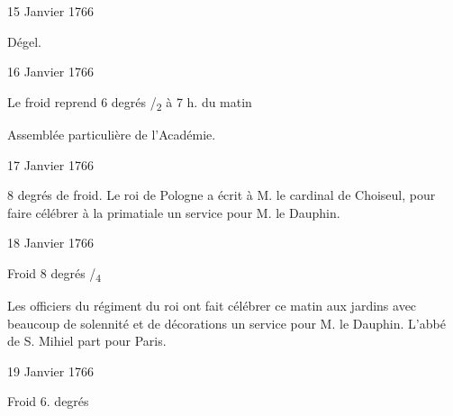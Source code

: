                      \begin{diary}{15 Janvier 1766}{}

                         Dégel. \bigskip


                     \end{diary}
                     \begin{diary}{16 Janvier 1766}{}

                         Le froid reprend 6 degrés
                              /\textsubscript{2} à 7 h. du matin
                        \bigskip


                         Assemblée particulière de l'Académie. \bigskip


                     \end{diary}

                     \begin{diary}{17 Janvier 1766}{}


                           8 degrés de froid. Le
                              roi de Pologne a écrit à
                           M. le cardinal de Choiseul, pour faire célébrer
                           à la primatiale un
                           service pour M. le Dauphin.
                        \bigskip


                     \end{diary}

                     \begin{diary}{18 Janvier 1766}{}


                           Froid 8 degrés
                              /\textsubscript{4}
                        \bigskip


                         Les officiers du régiment du roi ont fait célébrer
                           ce matin aux jardins avec beaucoup de
                           solennité et de décorations un service pour
                           M. le Dauphin. L'abbé de S. Mihiel part pour
                              Paris. \bigskip


                     \end{diary}

                     \begin{diary}{19 Janvier 1766}{}


                           Froid 6. degrés
                        \bigskip


                     \end{diary}

